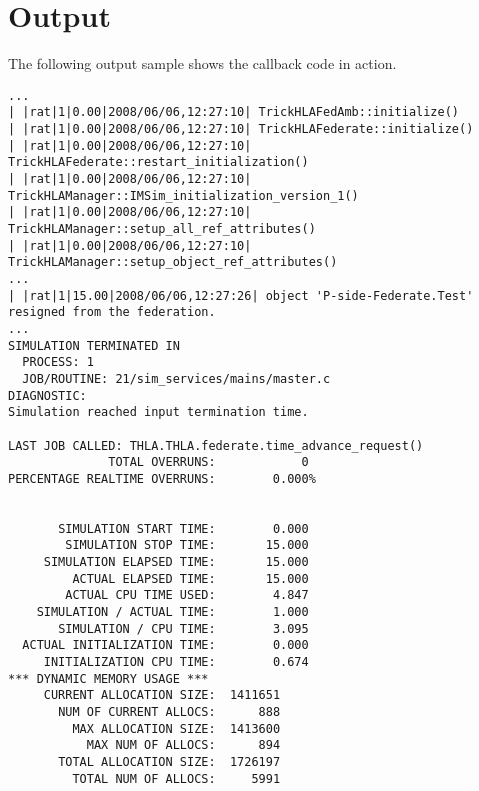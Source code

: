 \section{Output}

The following output sample shows the callback code in action.

\begin{lstlisting}[caption={output displayed on the console}]
...
| |rat|1|0.00|2008/06/06,12:27:10| TrickHLAFedAmb::initialize()
| |rat|1|0.00|2008/06/06,12:27:10| TrickHLAFederate::initialize()
| |rat|1|0.00|2008/06/06,12:27:10| TrickHLAFederate::restart_initialization()
| |rat|1|0.00|2008/06/06,12:27:10| TrickHLAManager::IMSim_initialization_version_1()
| |rat|1|0.00|2008/06/06,12:27:10| TrickHLAManager::setup_all_ref_attributes()
| |rat|1|0.00|2008/06/06,12:27:10| TrickHLAManager::setup_object_ref_attributes()
...
| |rat|1|15.00|2008/06/06,12:27:26| object 'P-side-Federate.Test' resigned from the federation.
...
SIMULATION TERMINATED IN
  PROCESS: 1
  JOB/ROUTINE: 21/sim_services/mains/master.c
DIAGNOSTIC:
Simulation reached input termination time.

LAST JOB CALLED: THLA.THLA.federate.time_advance_request()
              TOTAL OVERRUNS:            0
PERCENTAGE REALTIME OVERRUNS:        0.000%


       SIMULATION START TIME:        0.000
        SIMULATION STOP TIME:       15.000
     SIMULATION ELAPSED TIME:       15.000
         ACTUAL ELAPSED TIME:       15.000
        ACTUAL CPU TIME USED:        4.847
    SIMULATION / ACTUAL TIME:        1.000
       SIMULATION / CPU TIME:        3.095
  ACTUAL INITIALIZATION TIME:        0.000
     INITIALIZATION CPU TIME:        0.674
*** DYNAMIC MEMORY USAGE ***
     CURRENT ALLOCATION SIZE:  1411651
       NUM OF CURRENT ALLOCS:      888
         MAX ALLOCATION SIZE:  1413600
           MAX NUM OF ALLOCS:      894
       TOTAL ALLOCATION SIZE:  1726197
         TOTAL NUM OF ALLOCS:     5991
\end{lstlisting}
